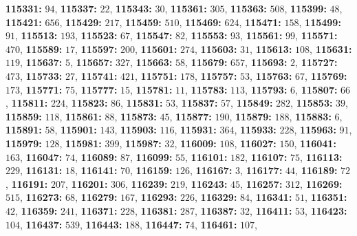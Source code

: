 \textsf{\bfseries 115331:} $94$, \textsf{\bfseries 115337:} $22$, \textsf{\bfseries 115343:} $30$, \textsf{\bfseries 115361:} $305$, \textsf{\bfseries 115363:} $508$, \textsf{\bfseries 115399:} $48$, \textsf{\bfseries 115421:} $656$, \textsf{\bfseries 115429:} $217$, \textsf{\bfseries 115459:} $510$, \textsf{\bfseries 115469:} $624$, \textsf{\bfseries 115471:} $158$, \textsf{\bfseries 115499:} $91$, \textsf{\bfseries 115513:} $193$, \textsf{\bfseries 115523:} $67$, \textsf{\bfseries 115547:} $82$, \textsf{\bfseries 115553:} $93$, \textsf{\bfseries 115561:} $99$, \textsf{\bfseries 115571:} $470$, \textsf{\bfseries 115589:} $17$, \textsf{\bfseries 115597:} $200$, \textsf{\bfseries 115601:} $274$, \textsf{\bfseries 115603:} $31$, \textsf{\bfseries 115613:} $108$, \textsf{\bfseries 115631:} $119$, \textsf{\bfseries 115637:} $5$, \textsf{\bfseries 115657:} $327$, \textsf{\bfseries 115663:} $58$, \textsf{\bfseries 115679:} $657$, \textsf{\bfseries 115693:} $2$, \textsf{\bfseries 115727:} $473$, \textsf{\bfseries 115733:} $27$, \textsf{\bfseries 115741:} $421$, \textsf{\bfseries 115751:} $178$, \textsf{\bfseries 115757:} $53$, \textsf{\bfseries 115763:} $67$, \textsf{\bfseries 115769:} $173$, \textsf{\bfseries 115771:} $75$, \textsf{\bfseries 115777:} $15$, \textsf{\bfseries 115781:} $11$, \textsf{\bfseries 115783:} $113$, \textsf{\bfseries 115793:} $6$, \textsf{\bfseries 115807:} $66$, \textsf{\bfseries 115811:} $224$, \textsf{\bfseries 115823:} $86$, \textsf{\bfseries 115831:} $53$, \textsf{\bfseries 115837:} $57$, \textsf{\bfseries 115849:} $282$, \textsf{\bfseries 115853:} $39$, \textsf{\bfseries 115859:} $118$, \textsf{\bfseries 115861:} $88$, \textsf{\bfseries 115873:} $45$, \textsf{\bfseries 115877:} $190$, \textsf{\bfseries 115879:} $188$, \textsf{\bfseries 115883:} $6$, \textsf{\bfseries 115891:} $58$, \textsf{\bfseries 115901:} $143$, \textsf{\bfseries 115903:} $116$, \textsf{\bfseries 115931:} $364$, \textsf{\bfseries 115933:} $228$, \textsf{\bfseries 115963:} $91$, \textsf{\bfseries 115979:} $128$, \textsf{\bfseries 115981:} $399$, \textsf{\bfseries 115987:} $32$, \textsf{\bfseries 116009:} $108$, \textsf{\bfseries 116027:} $150$, \textsf{\bfseries 116041:} $163$, \textsf{\bfseries 116047:} $74$, \textsf{\bfseries 116089:} $87$, \textsf{\bfseries 116099:} $55$, \textsf{\bfseries 116101:} $182$, \textsf{\bfseries 116107:} $75$, \textsf{\bfseries 116113:} $229$, \textsf{\bfseries 116131:} $18$, \textsf{\bfseries 116141:} $70$, \textsf{\bfseries 116159:} $126$, \textsf{\bfseries 116167:} $3$, \textsf{\bfseries 116177:} $44$, \textsf{\bfseries 116189:} $72$, \textsf{\bfseries 116191:} $207$, \textsf{\bfseries 116201:} $306$, \textsf{\bfseries 116239:} $219$, \textsf{\bfseries 116243:} $45$, \textsf{\bfseries 116257:} $312$, \textsf{\bfseries 116269:} $515$, \textsf{\bfseries 116273:} $68$, \textsf{\bfseries 116279:} $167$, \textsf{\bfseries 116293:} $226$, \textsf{\bfseries 116329:} $84$, \textsf{\bfseries 116341:} $51$, \textsf{\bfseries 116351:} $42$, \textsf{\bfseries 116359:} $241$, \textsf{\bfseries 116371:} $228$, \textsf{\bfseries 116381:} $287$, \textsf{\bfseries 116387:} $32$, \textsf{\bfseries 116411:} $53$, \textsf{\bfseries 116423:} $104$, \textsf{\bfseries 116437:} $539$, \textsf{\bfseries 116443:} $188$, \textsf{\bfseries 116447:} $74$, \textsf{\bfseries 116461:} $107$, 
